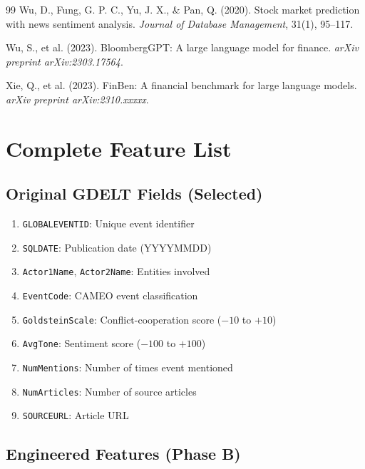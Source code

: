 \documentclass[11pt]{article}
\begin{document}
\begin{thebibliography}{99}
Wu, D., Fung, G. P. C., Yu, J. X., \& Pan, Q. (2020).
Stock market prediction with news sentiment analysis.
\textit{Journal of Database Management}, 31(1), 95--117.

Wu, S., et al. (2023).
BloombergGPT: A large language model for finance.
\textit{arXiv preprint arXiv:2303.17564}.

Xie, Q., et al. (2023).
FinBen: A financial benchmark for large language models.
\textit{arXiv preprint arXiv:2310.xxxxx}.

\end{thebibliography}

\appendix

\section{Complete Feature List}
\label{app:features}

\subsection{Original GDELT Fields (Selected)}

\begin{enumerate}
    \item \texttt{GLOBALEVENTID}: Unique event identifier
    \item \texttt{SQLDATE}: Publication date (YYYYMMDD)
    \item \texttt{Actor1Name}, \texttt{Actor2Name}: Entities involved
    \item \texttt{EventCode}: CAMEO event classification
    \item \texttt{GoldsteinScale}: Conflict-cooperation score ($-10$ to $+10$)
    \item \texttt{AvgTone}: Sentiment score ($-100$ to $+100$)
    \item \texttt{NumMentions}: Number of times event mentioned
    \item \texttt{NumArticles}: Number of source articles
    \item \texttt{SOURCEURL}: Article URL
\end{enumerate}

\subsection{Engineered Features (Phase B)}
\end{document}
